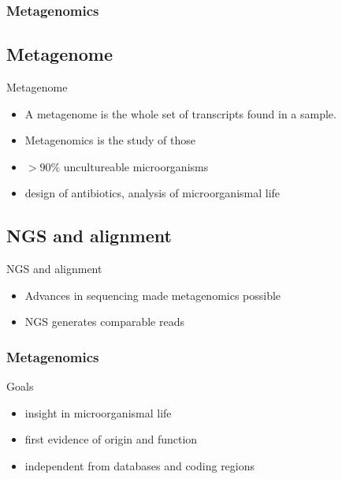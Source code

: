 \documentclass{beamer}
\begin{document}
\begin{frame}
\frametitle{Metagenomics}
\subsection{Metagenome}
\begin{block}{Metagenome}
                            \begin{itemize}
               	\item  A metagenome is the whole set of transcripts found in a sample.
                        \item Metagenomics is the study of those
                        \item $>90\%$ uncultureable microorganisms
                        \item design of antibiotics, analysis of microorganismal life    
                        \end{itemize}
\end{block}
\subsection{NGS and alignment}
\begin{block}{NGS and alignment}
\begin{itemize}
\item Advances in sequencing made metagenomics possible
\item NGS generates comparable reads
\end{itemize}
\end{block}
\end{frame}

\begin{frame}
\frametitle{Metagenomics}
	\begin{block}{Goals}
		\begin{itemize}
			\item insight in microorganismal life
			\item first evidence of origin and function
			\item independent from databases and coding regions
		\end{itemize}
	\end{block}
\end{frame}

\end{document}
